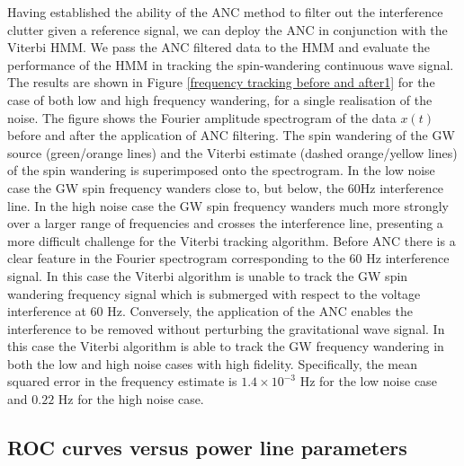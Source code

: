 \documentclass[pra,superscriptaddress,reprint,amsmath,amssymb,nofootinbib]{revtex4-2}
\begin{document}
Having established the ability of the ANC method to filter out the interference clutter given a reference signal, we can deploy the ANC in conjunction with the Viterbi HMM. We pass the ANC filtered data to the HMM and evaluate the performance of the HMM in tracking the spin-wandering continuous wave signal. The results are shown in  Figure \ref{frequency tracking before and after1} for the case of both low and high frequency wandering, for a single realisation of the noise. The figure shows the Fourier amplitude spectrogram of the data $x(t)$ before and after the application of ANC filtering. The spin wandering of the GW source (green/orange lines) and the Viterbi estimate (dashed orange/yellow lines) of the spin wandering is superimposed onto the spectrogram. In the low noise case the GW spin frequency wanders close to, but below, the 60Hz interference line. In the high noise case the GW spin frequency wanders much more strongly over a larger range of frequencies and crosses the interference line, presenting a more difficult challenge for the Viterbi tracking algorithm. Before ANC there is a clear feature in the Fourier spectrogram corresponding to the 60 Hz interference signal. In this case the Viterbi algorithm is unable to track the GW spin wandering frequency signal which is submerged with respect to the voltage interference at 60 Hz. Conversely,  the application of the ANC enables the interference to be removed without perturbing the gravitational wave signal. In this case the Viterbi algorithm is able to track the GW frequency wandering in both the low and high noise cases with high fidelity. Specifically, the mean squared error in the frequency estimate is $1.4 \times 10^{-3}$ Hz for the low noise case and $0.22$ Hz for the high noise case. 




\subsection{ROC curves versus power line parameters} \label{sec:roc1}
\end{document}
